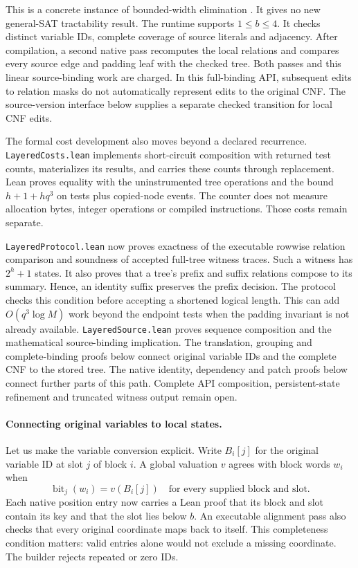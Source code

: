 \documentclass[11pt,a4paper]{article}
\numberwithin{equation}{section}
\theoremstyle{plain}
\theoremstyle{definition}
\theoremstyle{remark}
\begin{document}
This is a concrete instance of bounded-width elimination \citep{dechter1999bucket}. It gives no new general-SAT tractability result. The runtime supports $1\leq b\leq4$. It checks distinct variable IDs, complete coverage of source literals and adjacency. After compilation, a second native pass recomputes the local relations and compares every source edge and padding leaf with the checked tree. Both passes and this linear source-binding work are charged. In this full-binding API, subsequent edits to relation masks do not automatically represent edits to the original CNF. The source-version interface below supplies a separate checked transition for local CNF edits.

The formal cost development also moves beyond a declared recurrence. \texttt{LayeredCosts.lean} implements short-circuit composition with returned test counts, materializes its results, and carries these counts through replacement. Lean proves equality with the uninstrumented tree operations and the bound $h+1+hq^3$ on tests plus copied-node events. The counter does not measure allocation bytes, integer operations or compiled instructions. Those costs remain separate.

\texttt{LayeredProtocol.lean} now proves exactness of the executable rowwise relation comparison and soundness of accepted full-tree witness traces. Such a witness has $2^h+1$ states. It also proves that a tree's prefix and suffix relations compose to its summary. Hence, an identity suffix preserves the prefix decision. The protocol checks this condition before accepting a shortened logical length. This can add $O(q^3\log M)$ work beyond the endpoint tests when the padding invariant is not already available. \texttt{LayeredSource.lean} proves sequence composition and the mathematical source-binding implication. The translation, grouping and complete-binding proofs below connect original variable IDs and the complete CNF to the stored tree. The native identity, dependency and patch proofs below connect further parts of this path. Complete API composition, persistent-state refinement and truncated witness output remain open.

\paragraph{Connecting original variables to local states.}
Let us make the variable conversion explicit. Write $B_i[j]$ for the original variable ID at slot $j$ of block $i$. A global valuation $v$ agrees with block words $w_i$ when
\[
\operatorname{bit}_j(w_i)=v(B_i[j])
\quad\text{for every supplied block and slot.}
\]
Each native position entry now carries a Lean proof that its block and slot contain its key and that the slot lies below $b$. An executable alignment pass also checks that every original coordinate maps back to itself. This completeness condition matters: valid entries alone would not exclude a missing coordinate. The builder rejects repeated or zero IDs.
\end{document}
